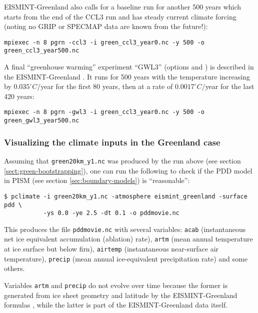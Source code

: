 EISMINT-Greenland also calls for a baseline run for another 500 years which starts from the end of the CCL3 run and has steady current climate forcing (noting no GRIP or SPECMAP data are known from the future!):

\begin{verbatim}
mpiexec -n 8 pgrn -ccl3 -i green_ccl3_year0.nc -y 500 -o green_ccl3_year500.nc
\end{verbatim}

A final ``greenhouse warming'' experiment ``GWL3'' (options  and ) is described in the EISMINT-Greenland \cite{RitzEISMINT}.  It runs for 500 years with the temperature increasing by $0.035^\circ C/$year for the first 80 years, then at a rate of $0.0017^\circ C/$year for the last 420 years:

\begin{verbatim}
mpiexec -n 8 pgrn -gwl3 -i green_ccl3_year0.nc -y 500 -o green_gwl3_year500.nc
\end{verbatim}

\subsubsection*{Visualizing the climate inputs in the Greenland case}
\label{sec:pdd-series-with-pclimate}

Assuming that \texttt{green20km_y1.nc} was produced by the run above (see section
\ref{sect:green-bootstrapping}), one can run the following to check if the PDD
model in PISM (see section \ref{sec:boundary-models}) is ``reasonable'':
\begin{verbatim}
$ pclimate -i green20km_y1.nc -atmosphere eismint_greenland -surface pdd \
           -ys 0.0 -ye 2.5 -dt 0.1 -o pddmovie.nc 
\end{verbatim}%
This produces the file \texttt{pddmovie.nc} with several variables: \texttt{acab}
(instantaneous net ice equivalent accumulation (ablation) rate), \texttt{artm}
(mean annual temperature at ice surface but below firn), \texttt{airtemp}
(instantaneous near-surface air temperature), \texttt{precip} (mean annual
ice-equivalent precipitation rate) and some others.

Variables \texttt{artm} and \texttt{precip} do not evolve over time because the 
former is generated from ice sheet geometry and latitude by the EISMINT-Greenland
formulas \cite{RitzEISMINT}, while the latter is part of the EISMINT-Greenland data
itself.

